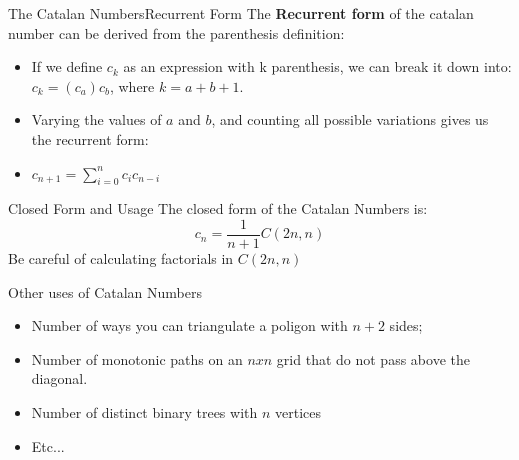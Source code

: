 \begin{frame}{The Catalan Numbers}{Recurrent Form}
  The {\bf Recurrent form} of the catalan number can be derived from the parenthesis definition:\bigskip

  \begin{itemize}
    \item If we define $c_k$ as an expression with k parenthesis, we can break it down into: $c_k = (c_a)c_b$, where $k = a + b + 1$. \medskip

    \item Varying the values of $a$ and $b$, and counting all possible variations gives us the recurrent form:\medskip

    \item $c_{n+1} = \sum_{i=0}^n c_ic_{n-i}$
  \end{itemize}
\end{frame}


\begin{frame}{Closed Form and Usage}
  The closed form of the Catalan Numbers is:
  \begin{equation*}
    c_n = \frac{1}{n+1}C(2n,n)
  \end{equation*}
  Be careful of calculating factorials in $C(2n,n)$\bigskip

  \begin{block}{Other uses of Catalan Numbers}
    \begin{itemize}
    \item Number of ways you can triangulate a poligon with $n+2$ sides;
    \item Number of monotonic paths on an $nxn$ grid that do not pass above
      the diagonal.
    \item Number of distinct binary trees with $n$ vertices
    \item Etc...
    \end{itemize}
  \end{block}
\end{frame}

%
%



